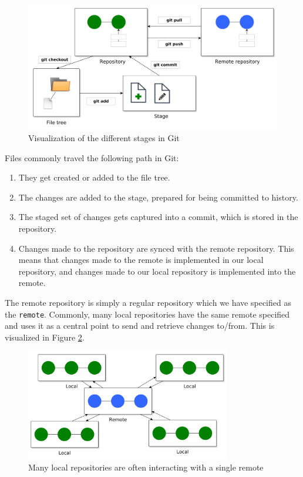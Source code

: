 \documentclass[../main/git_course_main.tex]{subfiles}
\begin{document}
\begin{figure}[h!]
	\centering
	\includegraphics[width=1.0\textwidth]{../visualizations/chapter5/51_stages_including_remote.pdf}
	\caption{Visualization of the different stages in Git}
	\label{fig:all_stages_visualized}
\end{figure}

Files commonly travel the following path in Git:

\begin{enumerate}
\item They get created or added to the file tree.
\item The changes are added to the stage, prepared for being committed to history.
\item The staged set of changes gets captured into a commit, which is stored in the repository.
\item Changes made to the repository are synced with the remote repository. This means that changes made to the remote is implemented in our local repository, and changes made to our local repository is implemented into the remote.
\end{enumerate}

The remote repository is simply a regular repository which we have specified as the \verb$remote$. Commonly, many local repositories have the same remote specified and uses it as  a central point to send and retrieve changes to/from. This is visualized in Figure \ref{fig:local_remote_repos}.

\begin{figure}[h!]
	\centering
	\includegraphics[width=0.8\textwidth]{../visualizations/chapter5/52_many_interacting_with_remote.pdf}
	\caption{Many local repositories are often interacting with a single remote}
	\label{fig:local_remote_repos}
\end{figure}
\end{document}
